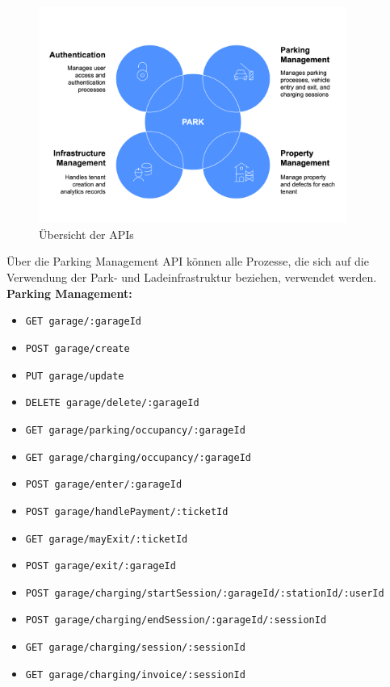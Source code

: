\begin{figure}[ht]
    \centering
    \includegraphics[width=0.9\textwidth]{resources/api-overview-blue.png}
    \caption{Übersicht der APIs}
    \label{fig:api-overview}
\end{figure}

Über die Parking Management API können alle Prozesse, die sich auf die Verwendung der Park- und Ladeinfrastruktur beziehen, verwendet werden. \\

\textbf{Parking Management:}
\begin{itemize}[noitemsep]
    \item[] \verb|GET garage/:garageId|
    \item[] \verb|POST garage/create|
    \item[] \verb|PUT garage/update|
    \item[] \verb|DELETE garage/delete/:garageId|
    \item[] \verb|GET garage/parking/occupancy/:garageId|
    \item[] \verb|GET garage/charging/occupancy/:garageId|
    \item[] \verb|POST garage/enter/:garageId|
    \item[] \verb|POST garage/handlePayment/:ticketId|
    \item[] \verb|GET garage/mayExit/:ticketId|
    \item[] \verb|POST garage/exit/:garageId|
    \item[] \verb|POST garage/charging/startSession/:garageId/:stationId/:userId|
    \item[] \verb|POST garage/charging/endSession/:garageId/:sessionId|
    \item[] \verb|GET garage/charging/session/:sessionId|
    \item[] \verb|GET garage/charging/invoice/:sessionId|
\end{itemize}

